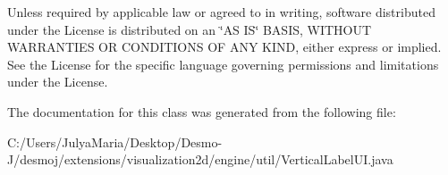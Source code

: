 Unless required by applicable law or agreed to in writing, software distributed under the License is distributed on an \char`\"{}\-A\-S I\-S\char`\"{} B\-A\-S\-I\-S, W\-I\-T\-H\-O\-U\-T W\-A\-R\-R\-A\-N\-T\-I\-E\-S O\-R C\-O\-N\-D\-I\-T\-I\-O\-N\-S O\-F A\-N\-Y K\-I\-N\-D, either express or implied. See the License for the specific language governing permissions and limitations under the License. 

The documentation for this class was generated from the following file\-:\begin{DoxyCompactItemize}
\item 
C\-:/\-Users/\-Julya\-Maria/\-Desktop/\-Desmo-\/\-J/desmoj/extensions/visualization2d/engine/util/Vertical\-Label\-U\-I.\-java\end{DoxyCompactItemize}
